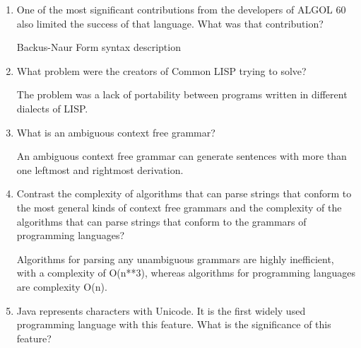 \begin{enumerate}
\begin{answer}
    \end{answer}


  \item One of the most significant contributions from the developers
    of ALGOL 60 also limited the success of that language. What was
    that contribution?

  \begin{answer}

    Backus-Naur Form syntax description

    \end{answer}

  \item What problem were the creators of Common LISP trying to solve?

  \begin{answer}

    The problem was a lack of portability between programs written in
    different dialects of LISP.

    \end{answer}

  \item What is an ambiguous context free grammar?

  \begin{answer}

    An ambiguous context free grammar can generate sentences with more than
    one leftmost and rightmost derivation.

    \end{answer}

  \item Contrast the complexity of algorithms that can parse strings
    that conform to the most general kinds of context free grammars
    and the complexity of the algorithms that can parse strings that
    conform to the grammars of programming languages?

  \begin{answer}

    Algorithms for parsing any unambiguous grammars are highly inefficient,
    with a complexity of O(n**3), whereas algorithms for programming languages
    are complexity O(n).

    \end{answer}

  \item Java represents characters with Unicode. It is the first
    widely used programming language with this feature. What is the
    significance of this feature?


\end{enumerate}
